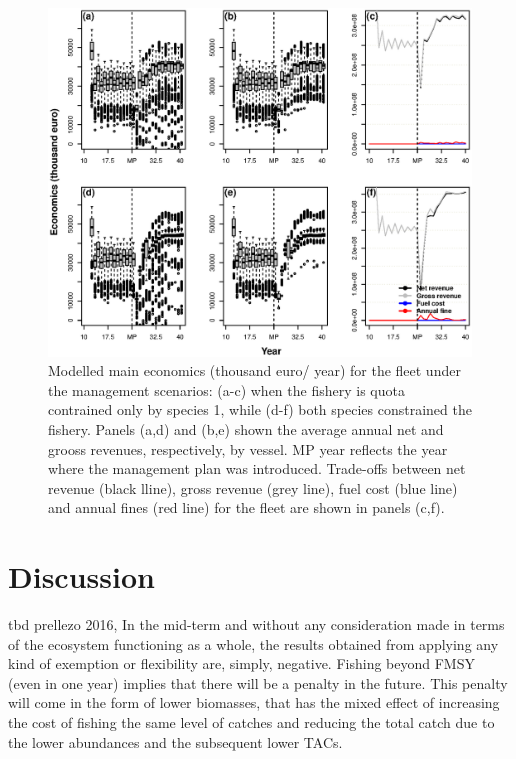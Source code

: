 \documentclass[12pt,oneline,a4paper,numbib]{ouparticle}
\numberwithin{equation}{subsection} %
\begin{document}
\begin{figure}[!ht]
\centering
\includegraphics[width=\textwidth]{Figures/Economics.eps} 
\caption{Modelled main economics (thousand euro/ year) for the fleet under the management scenarios: (a-c) when the fishery is quota contrained only by species 1, while (d-f) both species constrained the fishery. Panels (a,d) and (b,e) shown the average annual net and grooss revenues, respectively, by vessel. MP year reflects the year where the management plan was introduced. Trade-offs between net revenue (black lline), gross revenue (grey line), fuel cost (blue line) and annual fines (red line) for the fleet are shown in panels (c,f).}
\end{figure}

\clearpage

\section{Discussion}
\label{sec4}
tbd
prellezo 2016, In the mid-term and without any consideration made in terms of the ecosystem functioning as a whole, the results obtained from applying any kind of exemption or flexibility are, simply, negative. Fishing beyond FMSY (even in one year) implies that there will be a penalty in the future. This penalty will come in the form of lower biomasses, that has the mixed effect of increasing the cost of fishing the same level of catches and reducing the total catch due to the lower abundances and the subsequent lower TACs.
\end{document}
